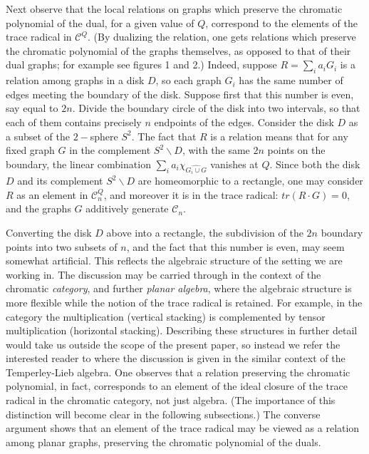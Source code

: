 \documentclass[11pt]{amsart}
\numberwithin{equation}{section}
\theoremstyle{definition}
\begin{document}
Next observe that the local relations on graphs which preserve the
chromatic polynomial of the dual, for a given value of $Q$, correspond
to the elements of the trace radical in ${\mathcal C}^Q$. (By
dualizing the relation, one gets relations which preserve the
chromatic polynomial of the graphs themselves, as opposed to that of
their dual graphs; for example see figures 1 and 2.)  Indeed, suppose
$R=\sum_i a_i G_i$ is a relation among graphs in a disk $D$, so each
graph $G_i$ has the same number of edges meeting the boundary of the
disk. Suppose first that this number is even, say equal to $2n$.
Divide the boundary circle of the disk into two intervals, so that
each of them contains precisely $n$ endpoints of the edges.  Consider
the disk $D$ as a subset of the $2-$sphere $S^2$.  The fact that $R$
is a relation means that for any fixed graph $G$ in the complement
$S^2\smallsetminus D$, with the same $2n$ points on the
boundary, the linear combination $\sum_i a_i {\chi}_{\widehat{G_i\cup
G}}$ vanishes at $Q$.  Since both the disk $D$ and its complement
$S^2\smallsetminus D$ are homeomorphic to a rectangle, one may
consider $R$ as an element in ${\mathcal C}^Q_n$, and moreover it is
in the trace radical: $tr(R\cdot G)=0$, and the graphs $G$ additively
generate ${\mathcal C}_n$.

Converting the disk $D$ above into a rectangle, the subdivision of the
$2n$ boundary points into two subsets of $n$, and the fact that this
number is even, may seem somewhat artificial. This reflects the
algebraic structure of the setting we are working in.  The discussion
may be carried through in the context of the chromatic {\em category},
and further {\em planar algebra}, where the algebraic structure is
more flexible while the notion of the trace radical is retained. For
example, in the category the multiplication (vertical stacking) is
complemented by tensor multiplication (horizontal stacking).
Describing these structures in further detail would take us outside
the scope of the present paper, so instead we refer the interested
reader to \cite[section 2]{F} where the discussion is given in the
similar context of the Temperley-Lieb algebra.  One observes that a
relation preserving the chromatic polynomial, in fact, corresponds to
an element of the ideal closure of the trace radical in the chromatic
category, not just algebra. (The importance of this distinction will
become clear in the following subsections.)  The converse argument
shows that an element of the trace radical may be viewed as a relation
among planar graphs, preserving the chromatic polynomial of the duals.
\end{document}
